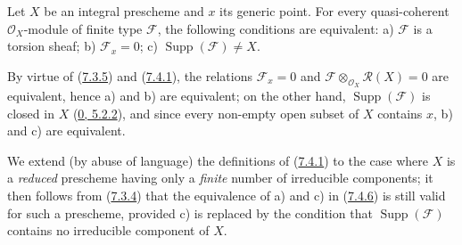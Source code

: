 \begin{proposition}[7.4.6]
\label{I.7.4.6}
Let $X$ be an integral prescheme and $x$ its generic point. For every
quasi-coherent $\mathscr{O}_X$-module of finite type $\mathscr{F}$, the
following conditions are equivalent: a) $\mathscr{F}$ is a torsion sheaf;
b) $\mathscr{F}_x=0$; c)
$\operatorname{Supp}(\mathscr{F})\neq X$.
\end{proposition}

By virtue of (\hyperref[I.7.3.5]{7.3.5}) and
(\hyperref[I.7.4.1]{7.4.1}), the relations $\mathscr{F}_x=0$ and
$\mathscr{F}\otimes_{\mathscr{O}_X}\mathscr{R}(X)=0$ are equivalent, hence
a) and b) are equivalent; on the other hand,
$\operatorname{Supp}(\mathscr{F})$ is closed in $X$
(\hyperref[0.5.2.2]{0, 5.2.2}), and since every non-empty open subset of
$X$ contains $x$, b) and c) are equivalent.

\begin{env}[7.4.7]
\label{I.7.4.7}
We extend (by abuse of language) the definitions of
(\hyperref[I.7.4.1]{7.4.1}) to the case where $X$ is a
\emph{reduced} prescheme having only a \emph{finite} number of irreducible
components; it then follows from (\hyperref[I.7.3.4]{7.3.4}) that the
equivalence of a) and c) in (\hyperref[I.7.4.6]{7.4.6}) is still valid for
such a prescheme, provided c) is replaced by the condition that
$\operatorname{Supp}(\mathscr{F})$ contains no irreducible component of $X$.
\end{env}
